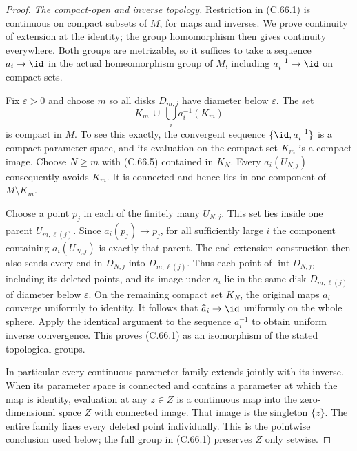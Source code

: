 \begin{proof}
\emph{The compact-open and inverse topology.}
Restriction in (C.66.1) is continuous on compact
subsets of $M$, for maps and inverses. We prove
continuity of extension at the identity; the
group homomorphism then gives continuity everywhere.
Both groups are metrizable, so it suffices to take
a sequence $a_i\to\id$ in the actual homeomorphism
group of $M$, including $a_i^{-1}\to\id$ on compact sets.

Fix $\varepsilon>0$ and choose $m$ so all disks
$D_{m,j}$ have diameter below $\varepsilon$.
The set
\[
             K_m\ \cup\ \bigcup_i a_i^{-1}(K_m)
                                                               \tag{C.66.5}
\]
is compact in $M$. To see this exactly, the
convergent sequence $\{\id,a_i^{-1}\}$ is a compact
parameter space, and its evaluation on the compact
set $K_m$ is a compact image. Choose $N\ge m$
with (C.66.5) contained in $K_N$.
Every $a_i(U_{N,j})$ consequently avoids $K_m$.
It is connected and hence lies in one component
of $M\setminus K_m$.

Choose a point $p_j$ in each of the finitely many
$U_{N,j}$. This set lies inside one parent
$U_{m,\ell(j)}$. Since $a_i(p_j)\to p_j$,
for all sufficiently large $i$ the component
containing $a_i(U_{N,j})$ is exactly that parent.
The end-extension construction then also sends
every end in $D_{N,j}$ into $D_{m,\ell(j)}$.
Thus each point of $\operatorname{int}D_{N,j}$,
including its deleted points, and its image
under $\widehat a_i$ lie in the same disk
$D_{m,\ell(j)}$ of diameter below $\varepsilon$.
On the remaining compact set $K_N$, the
original maps $a_i$ converge uniformly to identity.
It follows that $\widehat a_i\to\id$ uniformly
on the whole sphere. Apply the identical argument
to the sequence $a_i^{-1}$ to obtain uniform
inverse convergence. This proves (C.66.1) as
an isomorphism of the stated topological groups.

In particular every continuous parameter family
extends jointly with its inverse. When its parameter
space is connected and contains a parameter at which
the map is identity, evaluation at any $z\in Z$
is a continuous map into the zero-dimensional
space $Z$ with connected image. That image is
the singleton $\{z\}$. The entire family fixes
every deleted point individually. This is the
pointwise conclusion used below; the full group
in (C.66.1) preserves $Z$ only setwise.


\end{proof}
